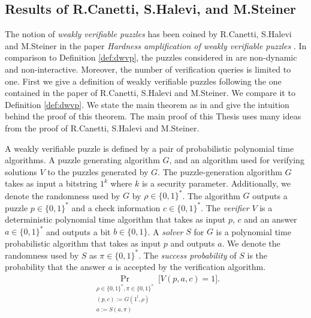 \documentclass[11pt,a4paper,titlepage]{memoir}
\begin{document}
\subsection{Results of R.Canetti, S.Halevi, and M.Steiner}
The notion of \textit{weakly verifiable puzzles} has been coined by R.Canetti, S.Halevi and M.Steiner in the paper
\textit{Hardness amplification of weakly verifiable puzzles} \cite{canetti2004hardness}.
In comparison to Definition \ref{def:dwvp}, the puzzles considered in \cite{canetti2004hardness} are non-dynamic and non-interactive.
Moreover, the number of verification queries is limited to one.
First we give a definition of weakly verifiable puzzles following the one contained in the paper of R.Canetti, S.Halevi and M.Steiner.
We compare it to Definition \ref{def:dwvp}.
We state the main theorem as in \cite{canetti2004hardness} and give the intuition behind the proof of this theorem.
The main proof of this Thesis uses many ideas from the proof of R.Canetti, S.Halevi and M.Steiner.
%
\begin{definition}
  \label{def:wvp}
A \textnormal{weakly verifiable puzzle} is defined by a pair of probabilistic polynomial time algorithms.
A puzzle generating algorithm $G$, and an algorithm used for verifying solutions $V$ to the puzzles generated by $G$.
The puzzle-generation algorithm $G$ takes as input a bitstring $1^k$ where $k$ is a security parameter.
Additionally, we denote the randomness used by $G$ by $\rho \in \{0,1\}^{*}$. The algorithm $G$ outputs a puzzle $p \in \{0,1\}^{*}$ and a check information $c \in \{0,1\}^{*}$.
The \textit{verifier} $V$ is a deterministic polynomial time algorithm that takes as input $p$, $c$ and an answer $a \in \{0,1\}^{*}$ and outputs a bit $b \in \{0,1\}$.
A \textit{solver} $S$ for $G$ is a polynomial time probabilistic algorithm that takes as input $p$ and outputs $a$.
We denote the randomness used by $S$ as $\pi \in \{0,1\}^{*}$.
The \textit{success probability} of $S$ is the probability that the answer $a$ is accepted by the verification algorithm.
\begin{align*}
  \underset{\substack{\rho \in \{0,1\}^{*}, \pi \in \{0,1\}^{*} \\ (p,c):=G(1^l, \rho) \\ a := S(a,\pi)}}{\Pr}\Big[ V(p, a,c) = 1\Big].
\end{align*}
\end{definition}
\end{document}
